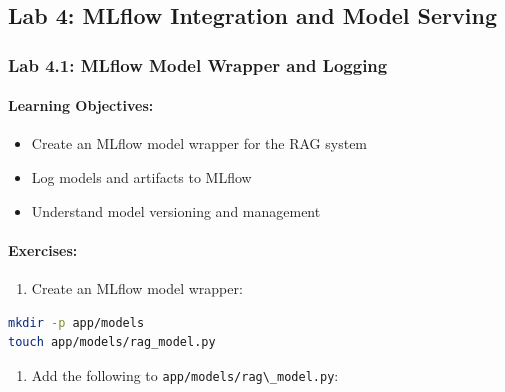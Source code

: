 \documentclass[
  screen,review,acmlarge]{acmart}
\newcommand{\passthrough}[1]{#1}
\providecommand{\tightlist}{%
  \setlength{\itemsep}{0pt}\setlength{\parskip}{0pt}}
\begin{document}
\subsection{Lab 4: MLflow Integration and Model Serving}\label{lab-4-mlflow-integration-and-model-serving}

\subsubsection{Lab 4.1: MLflow Model Wrapper and Logging}\label{lab-4.1-mlflow-model-wrapper-and-logging}

\paragraph{Learning Objectives:}\label{learning-objectives-10}

\begin{itemize}
\tightlist
\item
  Create an MLflow model wrapper for the RAG system
\item
  Log models and artifacts to MLflow
\item
  Understand model versioning and management
\end{itemize}

\paragraph{Exercises:}\label{exercises-9}

\begin{enumerate}
\def\labelenumi{\arabic{enumi}.}
\tightlist
\item
  Create an MLflow model wrapper:
\end{enumerate}

\begin{lstlisting}[language=bash]
mkdir -p app/models
touch app/models/rag_model.py
\end{lstlisting}

\begin{enumerate}
\def\labelenumi{\arabic{enumi}.}
\setcounter{enumi}{1}
\tightlist
\item
  Add the following to \passthrough{\lstinline!app/models/rag\_model.py!}:
\end{enumerate}
\end{document}
